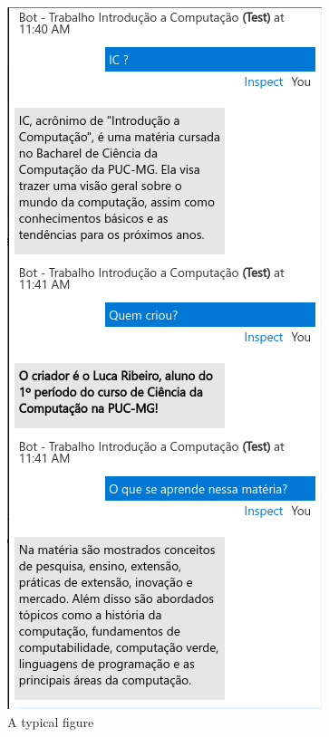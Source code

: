 \documentclass[12pt]{article}
\begin{document}
\begin{figure}[ht]
\centering
\includegraphics[width=.5\textwidth]{images/ChatBot.png}
\caption{A typical figure}
\label{fig:exampleFig1}
\end{figure}
\end{document}
